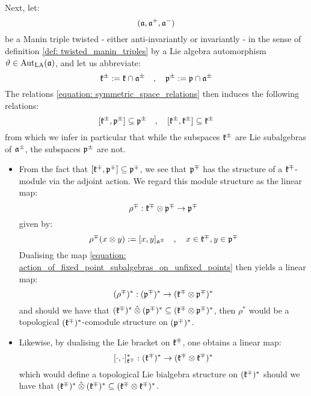         Next, let:
            $$(\mathfrak{a}, \mathfrak{a}^+, \mathfrak{a}^-)$$
        be a Manin triple twisted - either anti-invariantly or invariantly - in the sense of definition \ref{def: twisted_manin_triples} by a Lie algebra automorphism $\vartheta \in \operatorname{Aut}_{\mathrm{LA}}(\mathfrak{a})$, and let us abbreviate:
            \begin{equation} \label{equation: polarised_symmetric_space_decompositions}
                \mathfrak{k}^{\pm} := \mathfrak{k} \cap \mathfrak{a}^{\pm} \quad, \quad \mathfrak{p}^{\pm} := \mathfrak{p} \cap \mathfrak{a}^{\pm}
            \end{equation}
        The relations \eqref{equation: symmetric_space_relations} then induces the following relations:
            \begin{equation} \label{equation: polarised_symmetric_space_relations}
                [\mathfrak{k}^{\pm}, \mathfrak{p}^{\pm}] \subseteq \mathfrak{p}^{\pm} \quad, \quad [\mathfrak{k}^{\pm}, \mathfrak{k}^{\pm}] \subseteq \mathfrak{k}^{\pm} 
            \end{equation}
        from which we infer in particular that while the subspaces $\mathfrak{k}^{\pm}$ are Lie subalgebras of $\mathfrak{a}^{\pm}$, the subspaces $\mathfrak{p}^{\pm}$ are not.
        \begin{itemize}
            \item From the fact that $[\mathfrak{k}^{\mp}, \mathfrak{p}^{\mp}] \subseteq \mathfrak{p}^{\mp}$, we see that $\mathfrak{p}^{\mp}$ has the structure of a $\mathfrak{k}^{\mp}$-module via the adjoint action. We regard this module structure as the linear map:
                \begin{equation} \label{equation: action_of_fixed_point_subalgebras_on_unfixed_points}
                    \rho^{\mp}: \k^{\mp} \tensor \p^{\mp} \to \p^{\mp}
                \end{equation}
            given by:
                $$\rho^{\mp}(x \tensor y) := [x, y]_{\a^{\mp}} \quad, \quad x \in \k^{\mp}, y \in \p^{\mp}$$
            Dualising the map \eqref{equation: action_of_fixed_point_subalgebras_on_unfixed_points} then yields a linear map:
                $$(\rho^{\mp})^*: (\p^{\mp})^* \to (\k^{\mp} \tensor \p^{\mp})^*$$
            and should we have that $(\k^{\mp})^* \hattensor (\p^{\mp})^* \subseteq (\k^{\mp} \tensor \p^{\mp})^*$, then $\rho^*$ would be a topological $(\mathfrak{k}^{\mp})^*$-comodule structure on $(\mathfrak{p}^{\mp})^*$. 
            \item Likewise, by dualising the Lie bracket on $\mathfrak{k}^{\mp}$, one obtains a linear map:
                \begin{equation} \label{equation: dual_brackets_on_fixed_point_subalgebras}
                    [\cdot, \cdot]_{\k^{\mp}}^*: (\k^{\mp})^* \to (\k^{\mp} \tensor \k^{\mp})^*
                \end{equation}
            which would define a topological Lie bialgebra structure on $(\mathfrak{k}^{\mp})^*$ should we have that $(\k^{\mp})^* \hattensor (\k^{\mp})^* \subseteq (\k^{\mp} \tensor \k^{\mp})^*$.
        \end{itemize}
